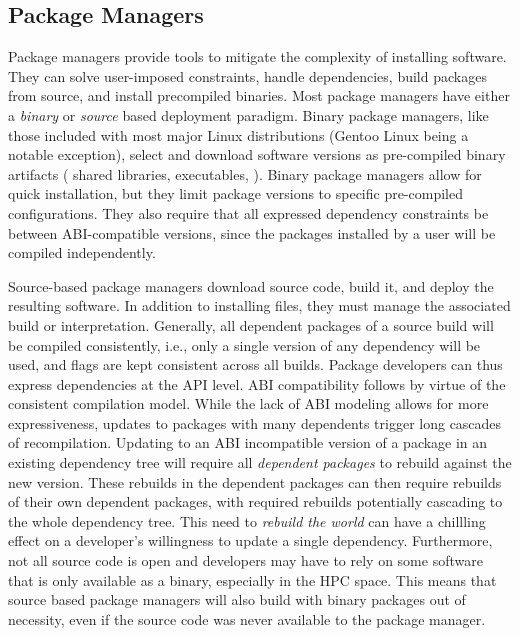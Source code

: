 \subsection{Package Managers}
\label{sec:background-pm}
Package managers provide tools to mitigate the complexity of installing
software. They can solve user-imposed constraints, handle dependencies,
build packages from source, and install precompiled binaries.
Most package managers have either a \emph{binary} or \emph{source} based
deployment paradigm. Binary package managers, like those included with
most major Linux distributions (Gentoo Linux being a notable exception), select
and download software versions as pre-compiled binary artifacts (\eg{} shared
libraries, executables, \etc{}). Binary package managers allow for quick
installation, but they limit package versions to specific pre-compiled
configurations. They also require that all expressed dependency constraints be between
ABI-compatible versions, since the packages installed by a user will be compiled
independently.

Source-based package managers download source code, build it, and deploy the
resulting software. In addition to installing files, they must manage the
associated build or interpretation. Generally, all dependent packages of a
source build will be compiled consistently, i.e., only a single version of any
dependency will be used, and flags are kept consistent across all
builds. Package developers can thus express dependencies at the API level.  ABI
compatibility follows by virtue of the consistent compilation model.  While the
lack of ABI modeling allows for more expressiveness, updates to packages with
many dependents trigger long cascades of recompilation. Updating to an ABI
incompatible version of a package in an existing dependency tree will require
all \emph{dependent packages} to rebuild against the new version. These rebuilds
in the dependent packages can then require rebuilds of their own dependent
packages, with required rebuilds potentially cascading to the whole dependency
tree. This need to \emph{rebuild the world} can have a chillling effect on a
developer's willingness to update a single dependency.  Furthermore, not all
source code is open and developers may have to rely on some software that is
only available as a binary, especially in the HPC space. This means that source
based package managers will also build with binary packages out of necessity,
even if the source code was never available to the package manager.

